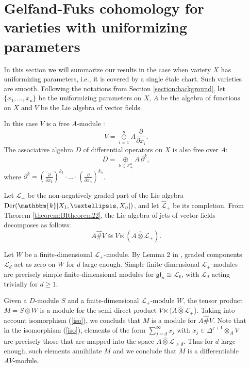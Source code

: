 \documentclass[12pt]{amsart}
\newcommand{\gl}{{\mathfrak{gl}}}
\renewcommand{\k}{{\mathbbm{k}}}
\renewcommand{\L}{{\mathcal{L}}}
\newcommand{\Z}{{\mathbb{Z}}}
\newcommand{\Der}{{\operatorname{Der}}}
\renewcommand{\sp}{{\#}}
\newcommand{\wo}{\widehat{\otimes}}
\theoremstyle{definition}
\begin{document}
\section{Gelfand-Fuks cohomology for varieties with uniformizing parameters}\label{section:etalecharts}

In this section we will summarize our results in the case when variety $X$ has uniformizing parameters, i.e., it is covered by a single \'etale chart.
Such varieties are smooth.
Following the notations from Section \ref{section:background}, let $\{x_1, \dots, x_n\}$ be the uniformizing parameters on $X$, 
$A$ be the algebra of functions on $X$ and $V$ be the Lie algebra of vector fields. 

In this case $V$ is a free $A$-module \cite{BilligFutornyNilsson}:
\[
V = \mathop\oplus\limits_{i=1}^n A \frac{\partial}{\partial x_i}.
\]
The associative algebra $D$ of differential operators on $X$ is also free over $A$:
\[
D = \mathop\oplus\limits_{k \in \Z_{+}^n} A \,\partial^k,
\]
where $\partial^k = \left(\frac{\partial}{\partial x_1}\right)^{k_1} \cdot \ldots \cdot \left(\frac{\partial}{\partial x_n}\right)^{k_n}$.

Let $\L_+$ be the non-negatively graded part of the Lie algebra $\Der (\k[X_1, \dots, X_n])$, and let $\widehat{\L}_+$ be its completion. From Theorem \ref{theorem:BItheorem22}, the Lie algebra of jets of vector fields decomposes as follows:
\begin{equation}
\label{iso}
A \widehat{\sp} V \cong V \ltimes (A \wo \L_+).
\end{equation}

Let $W$ be a finite-dimensional $\L_+$-module. By Lemma 2 in \cite{Billig2007}, graded components $\L_d$ act as zero on $W$ for $d$ large enough. 
Simple finite-dimensional $\L_+$-modules are precisely simple finite-dimensional modules for $\gl_n \cong \L_0$, with $\L_d$ acting trivially for $d \geq 1$.

Given a $D$-module $S$ and a finite-dimensional $\L_+$-module $W$,
the tensor product $M = S \otimes W$ is a module for the semi-direct product
$V \ltimes (A \wo \L_+$). Taking into account isomorphism (\ref{iso}), we conclude that $M$ is a module for $A \widehat{\sp} V$.
Note that in the isomorphism (\ref{iso}), elements of the form 
$\sum_{j=d}^\infty x_j$ with $x_j \in \Delta^{j+1} \otimes_A V$ are precisely those that are mapped into the space $A \wo  \L_{\geq d}$.
Thus for $d$ large enough, such elements annihilate $M$ and we conclude that $M$ is a differentiable $AV$-module.
\end{document}
